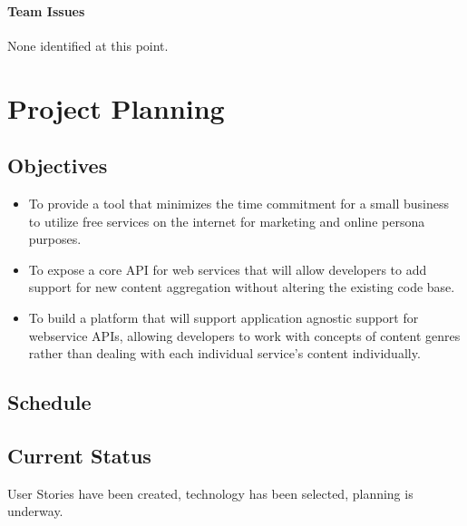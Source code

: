 \documentclass{article}
\begin{document}
\paragraph{Team Issues}

None identified at this point.

\section*{Project Planning}

\subsection*{Objectives}

\begin{itemize}
  \item To provide a tool that minimizes the time commitment for a small business to utilize free services on the internet for marketing and online persona purposes.
  \item To expose a core API for web services that will allow developers to add support for new content aggregation without altering the existing code base.
  \item To build a platform that will support application agnostic support for webservice APIs, allowing developers to work with concepts of content genres rather than dealing with each individual service's content individually.
\end{itemize}

\subsection*{Schedule}
\subsection*{Current Status}

User Stories have been created, technology has been selected, planning is underway.
\end{document}
